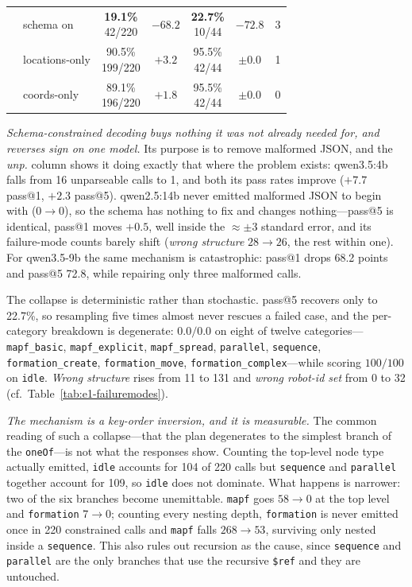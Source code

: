 \documentclass[10pt,twocolumn]{article}
\newcommand{\code}[1]{\texttt{\small #1}}
\begin{document}
\begin{table}[t]
\begin{tabular}{llccccc}
 & schema on         & \makecell{\textbf{19.1\%}\\\scriptsize 42/220} & $\mathbf{-68.2}$ & \makecell{\textbf{22.7\%}\\\scriptsize 10/44} & $\mathbf{-72.8}$ & 3 \\
 & locations-only     & \makecell{90.5\%\\\scriptsize 199/220} & $+3.2$  & \makecell{95.5\%\\\scriptsize 42/44} & $\pm0.0$ & 1 \\
 & coords-only         & \makecell{89.1\%\\\scriptsize 196/220} & $+1.8$  & \makecell{95.5\%\\\scriptsize 42/44} & $\pm0.0$ & 0 \\
\bottomrule
\end{tabular}
\end{table}

\emph{Schema-constrained decoding buys nothing it was not already needed for,
and reverses sign on one model.} Its purpose is to remove malformed JSON, and
the \emph{unp.} column shows it doing exactly that where the problem exists:
qwen3.5:4b falls from 16 unparseable calls to 1, and both its pass rates
improve ($+7.7$ pass@1, $+2.3$ pass@5). qwen2.5:14b never emitted malformed
JSON to begin with ($0\to0$), so the schema has nothing to fix and changes
nothing---pass@5 is identical, pass@1 moves $+0.5$, well inside the
$\approx\pm3$ standard error, and its failure-mode counts barely shift
(\emph{wrong structure} $28\to26$, the rest within one). For qwen3.5-9b the
same mechanism is catastrophic: pass@1 drops 68.2 points and pass@5 72.8,
while repairing only three malformed calls.

The collapse is deterministic rather than stochastic. pass@5 recovers only to
22.7\%, so resampling five times almost never rescues a failed case, and the
per-category breakdown is degenerate: $0.0/0.0$ on eight of twelve
categories---\code{mapf\_basic}, \code{mapf\_explicit}, \code{mapf\_spread},
\code{parallel}, \code{sequence}, \code{formation\_create},
\code{formation\_move}, \code{formation\_complex}---while scoring $100/100$ on
\code{idle}. \emph{Wrong structure} rises from 11 to 131 and \emph{wrong
robot-id set} from 0 to 32 (cf.\ Table~\ref{tab:e1-failuremodes}).

\emph{The mechanism is a key-order inversion, and it is measurable.} The
common reading of such a collapse---that the plan degenerates to the simplest
branch of the \code{oneOf}---is not what the responses show. Counting the
top-level node type actually emitted, \code{idle} accounts for 104 of 220
calls but \code{sequence} and \code{parallel} together account for 109, so
\code{idle} does not dominate. What happens is narrower: two of the six
branches become unemittable. \code{mapf} goes $58\to0$ at the top level and
\code{formation} $7\to0$; counting every nesting depth, \code{formation} is
never emitted once in 220 constrained calls and \code{mapf} falls $268\to53$,
surviving only nested inside a \code{sequence}. This also rules out recursion
as the cause, since \code{sequence} and \code{parallel} are the only branches
that use the recursive \code{\$ref} and they are untouched.
\end{document}
